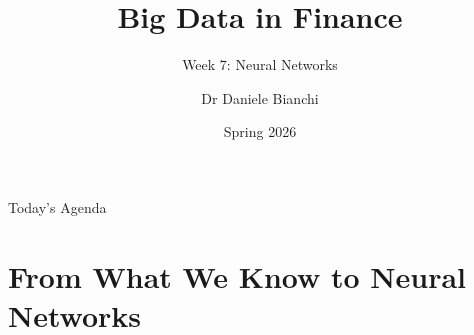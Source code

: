 \documentclass[10pt]{beamer}
\title{Big Data in Finance}
\subtitle{Week 7: Neural Networks}
\author{Dr Daniele Bianchi}
\date{Spring 2026}
\begin{document}
\AtBeginSection[]{
  \begin{frame}[plain]
    \vfill
    \begin{center}
      {\Large\color{ThemeBlue}\insertsection}
    \end{center}
    \vfill
  \end{frame}
}


\begin{frame}[plain]
  \titlepage
\end{frame}

\begin{frame}{Today's Agenda}
  \tableofcontents
\end{frame}

\section{From What We Know to Neural Networks}
\end{document}
